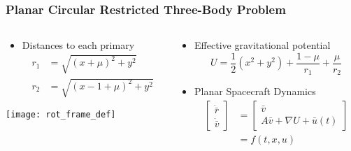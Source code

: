 \begin{frame} %
\frametitle{Planar Circular Restricted Three-Body Problem}
\begin{columns}
\begin{column}{0.5\textwidth}
   \begin{itemize}
   		\item Distances to each primary
		\begin{align*}
			r_1 &= \sqrt{\left( x+ \mu\right)^2 + y^2} \\
			r_2 &= \sqrt{\left( x - 1 + \mu\right)^2 + y^2}
		\end{align*}
   \end{itemize}
   \texttt{[image: rot\_frame\_def]}
\end{column}
\begin{column}{0.5\textwidth}
	\begin{itemize}
		\item Effective gravitational potential
	\begin{equation*}
		U = \frac{1}{2} \left( x^2 + y^2\right) + \frac{1-\mu}{r_1} + \frac{\mu}{r_2}
		\label{eq:eff_pot}
	\end{equation*}
		\item Planar Spacecraft Dynamics
\begin{align*}
	\left[\begin{array}{c} \dot{\bar{r}} \\ \dot{\bar{v}} \end{array} \right] &= 
	\left[ \begin{array}{c} \bar{v} \\ A \bar{v} + \nabla U + \bar{u}(t) \end{array} \right] \\
	&= f\left( t,x, u\right)
\end{align*}
	\end{itemize}
	
	
\end{column}
\end{columns}

\end{frame}   %

\section*{}
